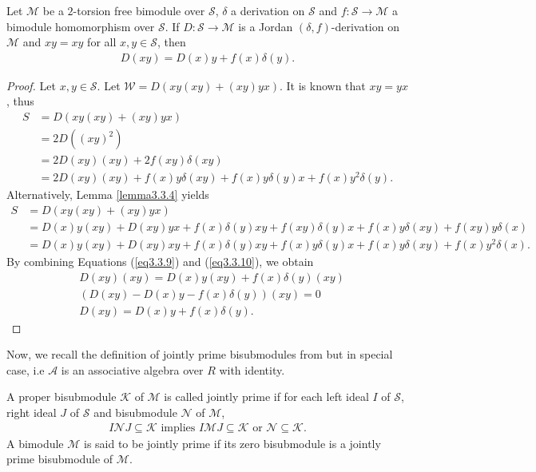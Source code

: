 \documentclass{arxiv}
\begin{document}
\begin{lemma}\label{lemma3.3.7}
    Let $\mathcal{M}$ be a $2$-torsion free bimodule over $\mathcal{S}$, $\delta$ a derivation on $\mathcal{S}$ and $f : \mathcal{S} \rightarrow \mathcal{M}$ a bimodule homomorphism over $\mathcal{S}$. If $D:\mathcal{S} \rightarrow \mathcal{M}$ is a Jordan $(\delta,f)$-derivation on $\mathcal{M}$ and $xy=xy$ for all $x,y \in \mathcal{S}$, then
    \begin{align*}
        D(xy)=D(x)y+f(x)\delta(y).
    \end{align*}
\end{lemma}
\begin{proof}
    Let $x,y \in \mathcal{S}$. Let $\mathcal{W}=D(xy(xy)+(xy)yx)$. It is known that $xy=yx$, thus
    \begin{align}
        S &= D(xy(xy)+(xy)yx) \nonumber \\
        &= 2D((xy)^2)\nonumber \\
        &= 2D(xy)(xy) + 2f(xy)\delta (xy) \nonumber \\
        &= 2D(xy) (xy) + f(x) y \delta (xy) + f(x)y \delta (y)x + f(x)y^2 \delta (y). \label{eq3.3.9}
    \end{align}
    Alternatively, Lemma \ref{lemma3.3.4} yields 
    \begin{align}
        S &= D(xy(xy)+(xy)yx) \nonumber \\
        &= D(x)y(xy)+D(xy)yx+f(x)\delta (y) xy+f(xy)\delta(y)x + f(x)y \delta (xy) + f(xy)y\delta (x) \nonumber \\
        &= D(x)y(xy) + D(xy)xy + f(x)\delta (y)xy + f(x)y \delta (y)x + f(x)y\delta (xy) + f(x)y^2\delta (x). \label{eq3.3.10}
    \end{align}
    By combining Equations (\ref{eq3.3.9}) and (\ref{eq3.3.10}), we obtain
    \begin{align*}
        &D(xy)(xy) = D(x) y(xy) + f(x)\delta (y) (xy)\\
        & (D(xy)-D(x)y-f(x)\delta (y))(xy) = 0\\
        & D(xy) = D(x)y + f(x)\delta (y).
    \end{align*}
\end{proof}

Now, we recall the definition of jointly prime bisubmodules from \cite{khumprapussorn} but in special case, i.e $\mathcal{A}$ is an associative algebra over $R$ with identity.
\begin{definition}
    A proper bisubmodule $\mathcal{K}$ of $\mathcal{M}$ is called jointly prime if for each left ideal $I$ of $\mathcal{S}$, right ideal $J$ of $\mathcal{S}$ and bisubmodule $\mathcal{N}$ of $\mathcal{M}$,
    \begin{align*}
        I \mathcal{N} J \subseteq \mathcal{K} \text{ implies } I \mathcal{M} J \subseteq \mathcal{K} \text{ or } \mathcal{N} \subseteq \mathcal{K}.
    \end{align*}
    A bimodule $\mathcal{M}$ is said to be jointly prime if its zero bisubmodule is a jointly prime bisubmodule of $\mathcal{M}$.
\end{definition}
\end{document}
